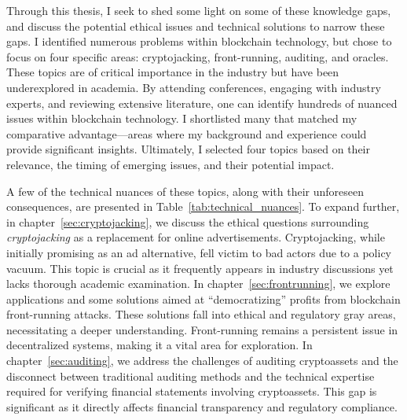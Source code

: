         



Through this thesis, I seek to shed some light on some of these knowledge gaps, and discuss the potential ethical issues and technical solutions to narrow these gaps. I identified numerous problems within blockchain technology, but chose to focus on four specific areas: cryptojacking, front-running, auditing, and oracles. These topics are of critical importance in the industry but have been underexplored in academia. By attending conferences, engaging with industry experts, and reviewing extensive literature, one can identify hundreds of nuanced issues within blockchain technology. I shortlisted many that matched my comparative advantage—areas where my background and experience could provide significant insights. Ultimately, I selected four topics based on their relevance, the timing of emerging issues, and their potential impact. 

A few of the technical nuances of these topics, along with their unforeseen consequences, are presented in Table~\ref{tab:technical_nuances}. To expand further, in chapter~\ref{sec:cryptojacking}, we discuss the ethical questions surrounding \textit{cryptojacking} as a replacement for online advertisements. Cryptojacking, while initially promising as an ad alternative, fell victim to bad actors due to a policy vacuum. This topic is crucial as it frequently appears in industry discussions yet lacks thorough academic examination. In chapter~\ref{sec:frontrunning}, we explore applications and some solutions aimed at ``democratizing'' profits from blockchain front-running attacks. These solutions fall into ethical and regulatory gray areas, necessitating a deeper understanding. Front-running remains a persistent issue in decentralized systems, making it a vital area for exploration. In chapter~\ref{sec:auditing}, we address the challenges of auditing cryptoassets and the disconnect between traditional auditing methods and the technical expertise required for verifying financial statements involving cryptoassets. This gap is significant as it directly affects financial transparency and regulatory compliance. 


